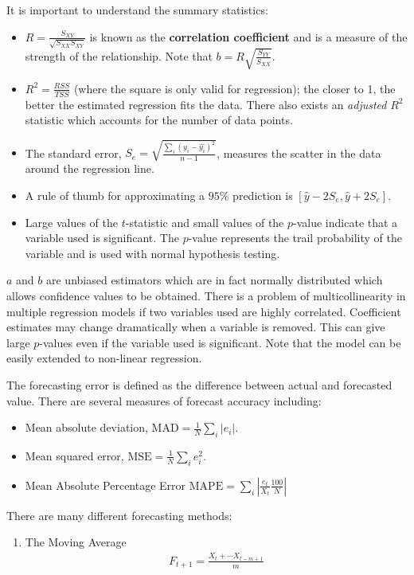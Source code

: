 \documentclass[a4paper]{article}
\newcommand{\ix}[1]{%
  \leavevmode %
  \marginpar{\small\emph{#1}}%
}
\begin{document}
\begin{enumerate}
It is important to understand the summary statistics:
\begin{itemize}
	\item $R = \frac{S_{XY}}{\sqrt{S_{XX} S_{XY}}}$ is known as the \textbf{correlation coefficient} and is a measure of the strength of the relationship. Note that $b=R\sqrt{\frac{S_{YY}}{S_{XX}}}$.
	\item $R^2 = \frac{RSS}{TSS}$ (where the square is only valid for regression); the closer to 1, the better the estimated regression fits the data. There also exists an \emph{adjusted} $R^2$ statistic which accounts for the number of data points. 
	\item The standard error, $S_e = \sqrt{\frac{\sum_i (y_i - \hat{y_i})^2}{n-1}}$, measures the scatter in the data around the regression line. 
	\item A rule of thumb for approximating a $95\%$ prediction is $[\hat{y} - 2S_e, \hat{y} + 2S_e ]$. 
	\item Large values of the $t$-statistic and small values of the $p$-value indicate that a variable used is significant. The $p$-value represents the trail probability of the variable and is used with normal hypothesis testing. 
\end{itemize}
$a$ and $b$ are unbiased estimators which are in fact normally distributed which allows confidence values to be obtained. There is a problem of multicollinearity in multiple regression models if two variables used are highly correlated. Coefficient estimates may change dramatically when a variable is removed. This can give large $p$-values even if the variable used is significant. Note that the model can be easily extended to non-linear regression. 

\ix{Forecasting}The forecasting error is defined as the difference between actual and forecasted value. There are several measures of forecast accuracy including:
\begin{itemize}
	\item Mean absolute deviation, $\text{MAD} = \frac{1}{N} \sum_i |e_i|$.
	\item Mean squared error, $\text{MSE} = \frac{1}{N} \sum_i e_i^2$.
	\item Mean Absolute Percentage Error $\text{MAPE} = \sum_i |\frac{e_t}{X_t}\frac{100}{N}|$
\end{itemize}
There are many different forecasting methods:
\begin{enumerate}
	\item The Moving Average
	\begin{align*}
	F_{t+1} = \frac{X_t + \cdots X_{t-m+1}}{m}
	\end{align*}
	

\end{enumerate}
\end{enumerate}
\end{document}
